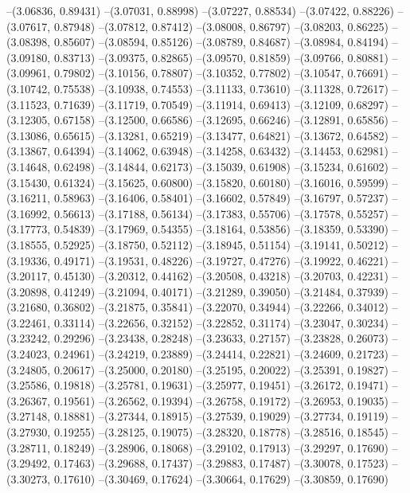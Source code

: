 --(3.06836, 0.89431)
--(3.07031, 0.88998)
--(3.07227, 0.88534)
--(3.07422, 0.88226)
--(3.07617, 0.87948)
--(3.07812, 0.87412)
--(3.08008, 0.86797)
--(3.08203, 0.86225)
--(3.08398, 0.85607)
--(3.08594, 0.85126)
--(3.08789, 0.84687)
--(3.08984, 0.84194)
--(3.09180, 0.83713)
--(3.09375, 0.82865)
--(3.09570, 0.81859)
--(3.09766, 0.80881)
--(3.09961, 0.79802)
--(3.10156, 0.78807)
--(3.10352, 0.77802)
--(3.10547, 0.76691)
--(3.10742, 0.75538)
--(3.10938, 0.74553)
--(3.11133, 0.73610)
--(3.11328, 0.72617)
--(3.11523, 0.71639)
--(3.11719, 0.70549)
--(3.11914, 0.69413)
--(3.12109, 0.68297)
--(3.12305, 0.67158)
--(3.12500, 0.66586)
--(3.12695, 0.66246)
--(3.12891, 0.65856)
--(3.13086, 0.65615)
--(3.13281, 0.65219)
--(3.13477, 0.64821)
--(3.13672, 0.64582)
--(3.13867, 0.64394)
--(3.14062, 0.63948)
--(3.14258, 0.63432)
--(3.14453, 0.62981)
--(3.14648, 0.62498)
--(3.14844, 0.62173)
--(3.15039, 0.61908)
--(3.15234, 0.61602)
--(3.15430, 0.61324)
--(3.15625, 0.60800)
--(3.15820, 0.60180)
--(3.16016, 0.59599)
--(3.16211, 0.58963)
--(3.16406, 0.58401)
--(3.16602, 0.57849)
--(3.16797, 0.57237)
--(3.16992, 0.56613)
--(3.17188, 0.56134)
--(3.17383, 0.55706)
--(3.17578, 0.55257)
--(3.17773, 0.54839)
--(3.17969, 0.54355)
--(3.18164, 0.53856)
--(3.18359, 0.53390)
--(3.18555, 0.52925)
--(3.18750, 0.52112)
--(3.18945, 0.51154)
--(3.19141, 0.50212)
--(3.19336, 0.49171)
--(3.19531, 0.48226)
--(3.19727, 0.47276)
--(3.19922, 0.46221)
--(3.20117, 0.45130)
--(3.20312, 0.44162)
--(3.20508, 0.43218)
--(3.20703, 0.42231)
--(3.20898, 0.41249)
--(3.21094, 0.40171)
--(3.21289, 0.39050)
--(3.21484, 0.37939)
--(3.21680, 0.36802)
--(3.21875, 0.35841)
--(3.22070, 0.34944)
--(3.22266, 0.34012)
--(3.22461, 0.33114)
--(3.22656, 0.32152)
--(3.22852, 0.31174)
--(3.23047, 0.30234)
--(3.23242, 0.29296)
--(3.23438, 0.28248)
--(3.23633, 0.27157)
--(3.23828, 0.26073)
--(3.24023, 0.24961)
--(3.24219, 0.23889)
--(3.24414, 0.22821)
--(3.24609, 0.21723)
--(3.24805, 0.20617)
--(3.25000, 0.20180)
--(3.25195, 0.20022)
--(3.25391, 0.19827)
--(3.25586, 0.19818)
--(3.25781, 0.19631)
--(3.25977, 0.19451)
--(3.26172, 0.19471)
--(3.26367, 0.19561)
--(3.26562, 0.19394)
--(3.26758, 0.19172)
--(3.26953, 0.19035)
--(3.27148, 0.18881)
--(3.27344, 0.18915)
--(3.27539, 0.19029)
--(3.27734, 0.19119)
--(3.27930, 0.19255)
--(3.28125, 0.19075)
--(3.28320, 0.18778)
--(3.28516, 0.18545)
--(3.28711, 0.18249)
--(3.28906, 0.18068)
--(3.29102, 0.17913)
--(3.29297, 0.17690)
--(3.29492, 0.17463)
--(3.29688, 0.17437)
--(3.29883, 0.17487)
--(3.30078, 0.17523)
--(3.30273, 0.17610)
--(3.30469, 0.17624)
--(3.30664, 0.17629)
--(3.30859, 0.17690)
